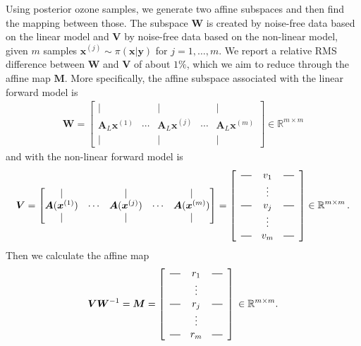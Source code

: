 Using posterior ozone samples, we generate two affine subspaces and then find the mapping between those.
The subspace $\bm{W}$ is created by noise-free data based on the linear model and $\bm{V}$ by noise-free data based on the non-linear model, given $m$ samples $\bm{x}^{(j)} \sim \pi(\bm{x}|\bm{y})$ for $j = 1, \dots,m$.
We report a relative RMS difference between $\bm{W}$ and $\bm{V}$ of about $1\%$, which we aim to reduce through the affine map $\bm{M}$.
More specifically, the affine subspace associated with the linear forward model is 
\begin{align}
	\bm{W} = \begin{bmatrix}
		\vert&   &  \vert & & \vert \\
		\bm{A}_{L} \bm{x}^{(1)} &  \cdots& \bm{A}_{L} \bm{x}^{(j)} &  \cdots & \bm{A}_{L} \bm{x}^{(m)} \\
		\vert&   &  \vert & & \vert 
	\end{bmatrix}
	\in \mathbb{R}^{m \times m}
\end{align} and with the non-linear forward model is 
\begin{align}
	\bm{V} = \begin{bmatrix}
		\vert&   &  \vert & & \vert \\
		\bm{A}(\bm{x}^{(1)}) &  \cdots& \bm{A}(\bm{x}^{(j)}) &  \cdots & \bm{A} (\bm{x}^{(m)})  \\
		\vert&   &  \vert & & \vert 
	\end{bmatrix} = 
	\begin{bmatrix}
		\begin{array}{ccc}
			\horzbar & v_{1} & \horzbar \\
			& \vdots    &          \\
			\horzbar & v_{j} & \horzbar \\
			& \vdots    &          \\
			\horzbar &v_{m} & \horzbar
		\end{array}
	\end{bmatrix}\in \mathbb{R}^{m \times m} \, .
\end{align}
Then we calculate the affine map 
\begin{align}
	\bm{V}\bm{W}^{-1} = \bm{M} =
	\begin{bmatrix}
		\begin{array}{ccc}
			\horzbar & r_{1} & \horzbar \\
			& \vdots    &          \\
			\horzbar & r_{j} & \horzbar \\
			& \vdots    &          \\
			\horzbar &r_{m} & \horzbar
		\end{array}
	\end{bmatrix}\, \in \mathbb{R}^{m \times m} .
\end{align}
